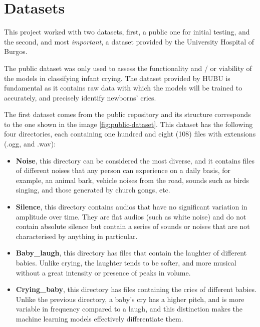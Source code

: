 \newpage
\section{Datasets}
This project worked with two datasets, first, a public one for initial testing, and the second, and most \textit{important}, a dataset provided by the University Hospital of Burgos. 

\begin{tcolorbox}
The public dataset was only used to assess the functionality and / or viability of the models in classifying infant crying. The dataset provided by HUBU is fundamental as it contains raw data with which the models will be trained to accurately, and precisely identify newborns’ cries.
\end{tcolorbox}

The first dataset comes from the public repository  and its structure corresponds to the one shown in the image \ref{fig:public-dataset}. This dataset has the following four directories, each containing one hundred and eight (108) files with extensions (.ogg, and .wav): 
\begin{itemize}
    \item \textbf{Noise}, this directory can be considered the most diverse, and it contains files of different noises that any person can experience on a daily basis, for example, an animal bark, vehicle noises from the road, sounds such as birds singing, and those generated by church gongs, etc. 
    \item \textbf{Silence}, this directory contains audios that have no significant variation in amplitude over time. They are flat audios (such as white noise) and do not contain absolute silence but contain a series of sounds or noises that are not characterised by anything in particular.
    \item \textbf{Baby\_laugh}, this directory has files that contain the laughter of different babies. Unlike crying, the laughter tends to be softer, and more musical without a great intensity or presence of peaks in volume.
    \item \textbf{Crying\_baby}, this directory has files containing the cries of different babies. Unlike the previous directory, a baby's cry has a higher pitch, and is more variable in frequency compared to a laugh, and this distinction makes the machine learning models effectively differentiate them.
\end{itemize}

